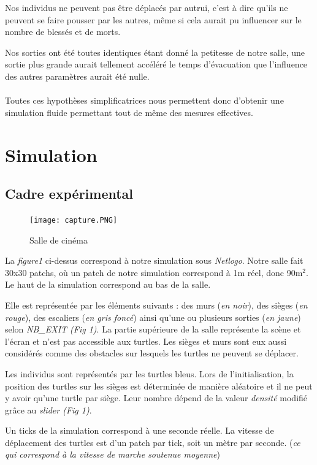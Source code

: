 \documentclass{article}
\begin{document}
Nos individus ne peuvent pas être déplacés par autrui, c’est à dire qu’ils ne peuvent se faire pousser par les autres, même si cela aurait pu influencer sur le nombre de blessés et de morts.

Nos sorties ont été toutes identiques étant donné la petitesse de notre salle, une sortie plus grande aurait tellement accéléré le temps d’évacuation que l’influence des autres paramètres aurait été nulle.\\\\
Toutes ces hypothèses simplificatrices nous permettent donc d’obtenir une simulation fluide permettant tout de même des mesures effectives. 



\section{Simulation} 
\subsection{Cadre expérimental} 
\begin{figure}[H]
	\texttt{[image: capture.PNG]}
  \centering
	\caption{Salle de cinéma}
 	\label{pic: capture}
\end{figure}

La {\it figure1} ci-dessus correspond à notre simulation sous {\it Netlogo}. Notre salle fait 30x30 patchs, où un patch de notre simulation correspond à 1m réel, donc 90m$^2$. Le haut de la simulation correspond au bas de la salle.

Elle est représentée par les éléments suivants : des murs ({\it en noir}), des sièges ({\it en rouge}), des escaliers ({\it en gris foncé}) ainsi qu'une ou plusieurs sorties ({\it en jaune}) selon {\it NB\_EXIT (Fig 1)}.
La partie supérieure de la salle représente la scène et l'écran et n'est pas accessible aux turtles. Les sièges et murs sont eux aussi considérés comme des obstacles sur lesquels les turtles ne peuvent se déplacer.

Les individus sont représentés par les turtles bleus. Lors de l'initialisation, la position des turtles sur les sièges est déterminée de manière aléatoire et il ne peut y avoir qu'une turtle par siège. Leur nombre dépend de la valeur {\it densité} modifié grâce au {\it slider (Fig 1)}.

Un ticks de la simulation correspond à une seconde réelle. La vitesse de déplacement des turtles est d'un patch par tick, soit un mètre par seconde. ({\em ce qui correspond à la vitesse de marche soutenue moyenne})
\end{document}
